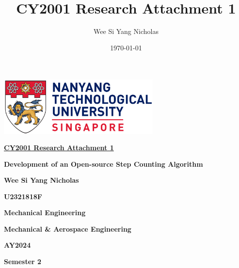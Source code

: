 \documentclass[12pt]{report}
\author{Wee Si Yang Nicholas}
\date{\today}
\title{CY2001 Research Attachment 1}
\begin{document}
\begin{titlepage}
    \begin{center}
        \includegraphics[height=8em]{ntu-logo}

        \vspace*{1cm}

        \textbf{\underline{\LARGE CY2001 Research Attachment 1}}

        \vspace*{2cm}

        \textbf{\Large{Development of an Open-source Step Counting Algorithm}}

        \vspace*{3.5cm}

        \textbf{\large{Wee Si Yang Nicholas}}

        \textbf{\large{U2321818F}}

        \textbf{\large{Mechanical Engineering}}

        \textbf{\large{Mechanical \& Aerospace Engineering}}

        \vspace*{2.5cm}

        \textbf{\large{AY2024}}

        \textbf{\large{Semester 2}}
    \end{center}
\end{titlepage}

\makeatletter
\newcommand{\chaptertitle}{}
\let\stdchapter\chapter
\newcommand*\starchapter[1]{
    \clearpage
    \renewcommand{\chaptertitle}{#1}
    \stdchapter*{#1}
    \addcontentsline{toc}{chapter}{\chaptertitle}
}
\newcommand{\nostarchapter}[2][]{
    \clearpage
    \renewcommand{\chaptertitle}{#2}
    \stdchapter{#2}
}
\makeatother

\fancyhead{}
\fancyhead[R]{\chaptertitle}

\renewcommand{\chapter}{\starchapter}
\end{document}
